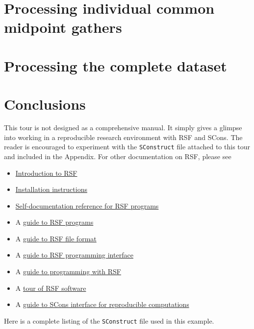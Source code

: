 \section{Processing individual common midpoint gathers}

 \clearpage
{} \clearpage
{} \clearpage
{} \clearpage
{} \clearpage

\section{Processing the complete dataset}

 \clearpage
{} \clearpage

\section{Conclusions}

This tour is not designed as a comprehensive manual. It simply gives a
glimpse into working in a reproducible research environment with RSF
and SCons. The reader is encouraged to experiment with the
\texttt{SConstruct} file attached to this tour and included in the
Appendix. For other documentation on RSF, please see
\begin{itemize}
\item \href{http://egl.beg.utexas.edu/RSF/book/rsf/rsf/tour_html/}{Introduction to RSF}  
\item  \href{http://egl.beg.utexas.edu/RSF/book/rsf/rsf/install_html/}{Installation instructions}
\item \href{http://egl.beg.utexas.edu/RSF/}{Self-documentation reference for RSF programs}
\item A \href{http://egl.beg.utexas.edu/RSF/book/rsf/rsf/prog_html/}{guide to RSF programs}
\item A \href{http://egl.beg.utexas.edu/RSF/book/rsf/rsf/format_html/}
  {guide to RSF file format}
\item A \href{http://egl.beg.utexas.edu/RSF/book/rsf/rsf/api_html/}{guide to
    RSF programming interface}
\item A \href{http://egl.beg.utexas.edu/RSF/book/rsf/rsf/demo_html/}{guide to programming with RSF}
\item A \href{http://egl.beg.utexas.edu/RSF/book/rsf/rsf/tour_html/}{tour of RSF software}
\item A
  \href{http://egl.beg.utexas.edu/RSF/book/rsf/scons/paper_html/}{guide
    to SCons interface for reproducible computations}
\end{itemize}





Here is a complete listing of the \texttt{SConstruct} file used in this
example.


